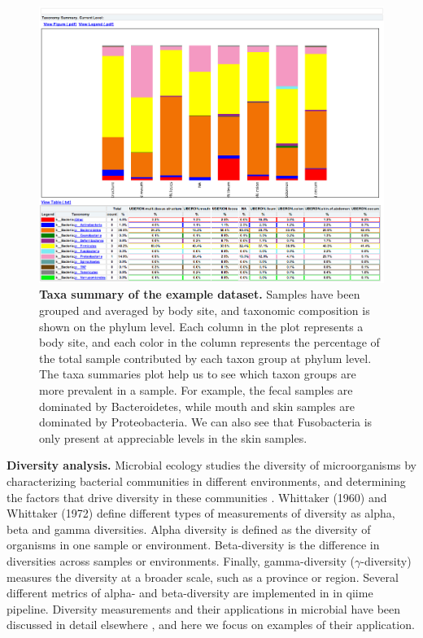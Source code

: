 \begin{figure}[htbp]
\includegraphics[width=0.75\columnwidth]{chapter_book_figures/Figure_5.jpg}
\caption[Taxa summary of the example dataset]{\textbf{Taxa summary of the example dataset.}
Samples have been grouped and averaged by body site, and taxonomic composition is shown on
the phylum level. Each column in the plot represents a body site, and each color in the column
represents the percentage of the total sample contributed by each taxon group at phylum level.
The taxa summaries plot help us to see which taxon groups are more prevalent in a sample.
For example, the fecal samples are dominated by Bacteroidetes, while mouth and skin samples
are dominated by Proteobacteria. We can also see that Fusobacteria is only present at appreciable
levels in the skin samples.}
\label{bfigure5}
\end{figure}

\textbf{Diversity analysis.} Microbial ecology studies the diversity of microorganisms
by characterizing bacterial communities in different environments, and determining the
factors that drive diversity in these communities \cite{Atlas1998}. Whittaker (1960) and
Whittaker (1972) define different types of measurements of diversity as alpha, beta and gamma
diversities. Alpha diversity is defined as the diversity of organisms in one sample or environment.
Beta-diversity is the difference in diversities across samples or environments. Finally,
gamma-diversity ($\gamma$-diversity) measures the diversity at a broader scale, such as a
province or region. Several different metrics of alpha- and beta-diversity are implemented in in
\gls{qiime} pipeline. Diversity measurements and their applications in microbial have been discussed in
detail elsewhere \cite{Jost2007, Kuczynski2010Patterns, Lozupone2008}, and here we focus on
examples of their application.

